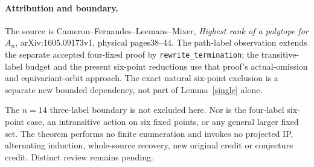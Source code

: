 \documentclass[11pt,a4paper]{article}
\begin{document}
\paragraph{Attribution and boundary.}
The source is Cameron--Fernandes--Leemans--Mixer,
\emph{Highest rank of a polytope for $A_n$}, arXiv:1605.09173v1,
physical pages38--44. The path-label observation extends the separate
accepted four-fixed proof by \texttt{rewrite\_termination}; the
transitive-label budget and the present six-point reductions use that
proof's actual-omission and equivariant-orbit approach. The exact
natural six-point exclusion is a separate new bounded dependency,
not part of Lemma~\ref{single} alone.

The $n=14$ three-label boundary is not excluded here. Nor is the
four-label six-point case, an intransitive action on six fixed points,
or any general larger fixed set. The theorem performs no finite
enumeration and invokes no projected IP, alternating induction,
whole-source recovery, new original credit or conjecture credit.
Distinct review remains pending.
\end{document}
